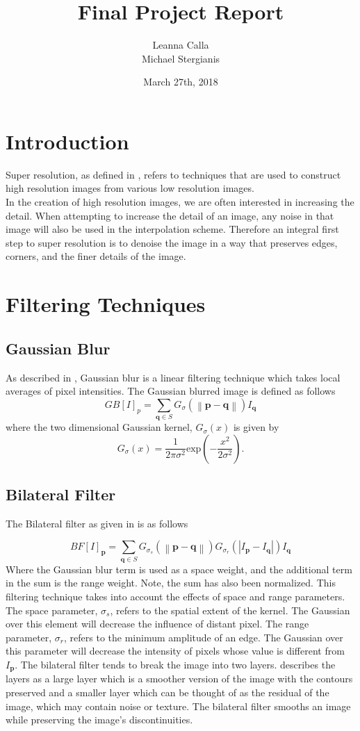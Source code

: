 \documentclass{article}
\title{Final Project Report}
\author{Leanna Calla \\ Michael Stergianis}
\date{March 27th, 2018}
\newcommand{\norm}[1]{\left\| #1 \right\|}
\begin{document}
\maketitle
%
%
\section{Introduction}
\label{sec:introduction}
Super resolution, as defined in \cite{Yang}, refers to techniques that
are used to construct high resolution images from various low
resolution images. \\

In the creation of high resolution images, we are often interested in
increasing the detail. When attempting to increase the detail of an image, any noise in
that image will also be used in the interpolation scheme. Therefore
an integral first step to super resolution is to denoise the image
in a way that preserves edges, corners, and the finer details of the
image.
%
%
\section{Filtering Techniques}
\label{sec:filter-tech}
\subsection{Gaussian Blur}
\label{subsec:gauss-blur}
As described in \cite{bilateral}, Gaussian blur is a linear filtering
technique which takes local averages of pixel intensities. The
Gaussian blurred image is defined as follows
\[GB[I]_p = \displaystyle \sum_{\textbf{q} \in S}G_{\sigma} \left(
    \norm{\textbf{p} - \textbf{q}}\right)I_{\textbf{q}} \]
where the two dimensional Gaussian kernel, $G_{\sigma}(x)$ is given by
\[G_{\sigma}(x) = \frac{1}{2 \pi \sigma^2} \text{exp} \left(-
    \frac{x^2}{2 \sigma^2}\right). \]
%
\subsection{Bilateral Filter}
\label{sec:bilateral-filter}
The Bilateral filter as given in \cite{Faisal-bilateral} is as follows

\[ BF[I]_{\textbf{p}}= \displaystyle \sum_{\textbf{q} \in S} G_{\sigma_s} \left(\norm{\textbf{p} - \textbf{q}}\right) G_{\sigma_r} \left(|I_{\textbf{p}} - I_{\textbf{q}}|\right)I_{\textbf{q}} \]
Where the Gaussian blur term is used as a space weight, and the
additional term in the sum is the range weight. Note, the sum has also
been normalized. This filtering technique takes into account the
effects of space and range parameters. The space parameter,
$\sigma_s$, refers to the spatial extent of the kernel. The Gaussian
over this element will decrease the influence of distant pixel. The
range parameter, $\sigma_r$, refers to the minimum amplitude of an
edge. The Gaussian over this parameter will decrease the intensity of
pixels whose value is different from $I_{\textbf{p}}$. The bilateral
filter tends to break the image into two layers. \cite{bilateral}
describes the layers as a large layer which is a smoother version of
the image with the contours preserved and a smaller layer which can be
thought of as the residual of the image, which may contain noise or
texture. The bilateral filter smooths an image while preserving the
image's discontinuities. 
%
\end{document}
